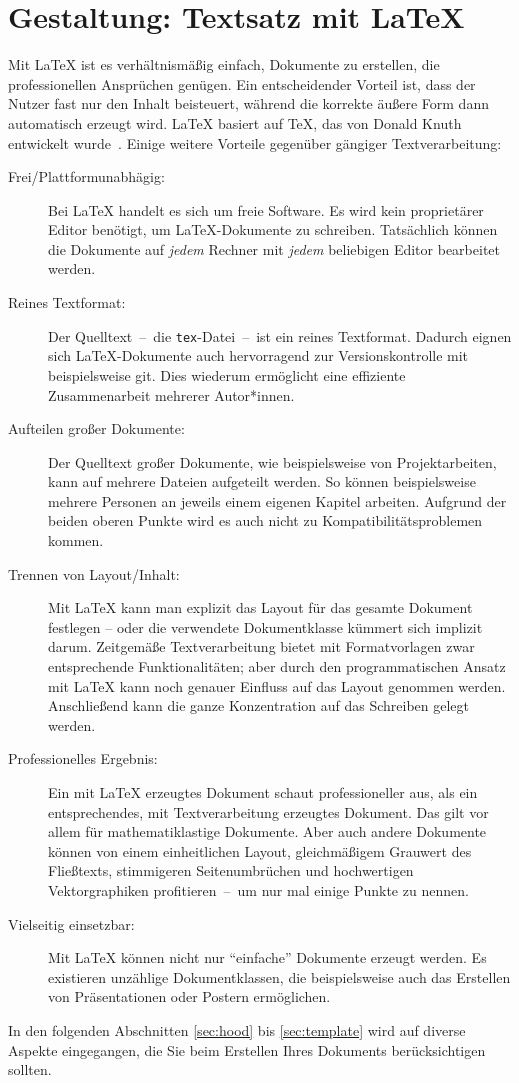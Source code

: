 \chapter{Gestaltung: Textsatz mit \LaTeX}
\label{chap:Textsatz}
%
Mit \LaTeX{} ist es verhältnismäßig einfach, Dokumente zu erstellen, die professionellen Ansprüchen genügen. Ein entscheidender Vorteil ist, dass der Nutzer fast nur den Inhalt beisteuert, während die korrekte äußere Form dann automatisch erzeugt wird. \LaTeX{} basiert auf \TeX{}, das von Donald Knuth entwickelt wurde~\cite{knuth:tex}. Einige weitere Vorteile gegenüber gängiger
Textverarbeitung:
\begin{description}
	\item[Frei/Plattformunabhägig:] Bei \LaTeX{} handelt es sich um freie 
	Software. Es wird kein proprietärer Editor benötigt, um \LaTeX{}-Dokumente
	zu schreiben. Tatsächlich können die Dokumente auf \emph{jedem} Rechner
	mit \emph{jedem} beliebigen Editor bearbeitet werden.
	\item[Reines Textformat:] Der Quelltext~--~die \texttt{tex}-Datei~--~ist
	ein reines Textformat. Dadurch eignen sich \LaTeX{}-Dokumente auch 
	hervorragend zur Versionskontrolle mit beispielsweise git. Dies wiederum
	ermöglicht eine effiziente Zusammenarbeit mehrerer Autor*innen.
	\item[Aufteilen großer Dokumente:] Der Quelltext großer Dokumente, wie 
	beispielsweise von Projektarbeiten, kann auf mehrere Dateien
	aufgeteilt werden. So können beispielsweise mehrere Personen an jeweils
	einem eigenen Kapitel arbeiten. Aufgrund der beiden oberen Punkte wird es 
	auch nicht zu Kompatibilitätsproblemen kommen.
	\item[Trennen von Layout/Inhalt:] Mit \LaTeX{} kann man explizit das
	Layout für das gesamte Dokument festlegen -- oder die verwendete 
	Dokumentklasse kümmert sich implizit darum. Zeitgemäße Textverarbeitung
	bietet mit Formatvorlagen zwar entsprechende Funktionalitäten; aber
	durch den programmatischen Ansatz mit \LaTeX{} kann noch genauer
	Einfluss auf das Layout genommen werden. Anschließend kann die ganze
	Konzentration auf das Schreiben gelegt werden.
	\item[Professionelles Ergebnis:] Ein mit \LaTeX{} erzeugtes Dokument
	schaut professioneller aus, als ein entsprechendes, mit Textverarbeitung
	erzeugtes Dokument. Das gilt vor allem für mathematiklastige Dokumente.
	Aber auch andere Dokumente können von einem einheitlichen 
	Layout, gleichmäßigem Grauwert des Fließtexts, stimmigeren Seitenumbrüchen 
	und hochwertigen Vektorgraphiken profitieren~--~um nur mal einige Punkte zu 
	nennen.
	\item[Vielseitig einsetzbar:] Mit \LaTeX{} können nicht nur 
	\enquote{einfache} Dokumente erzeugt werden. Es existieren unzählige
	Dokumentklassen, die beispielsweise auch das Erstellen von Präsentationen
	oder Postern ermöglichen.
\end{description}
\par
In den folgenden Abschnitten \ref{sec:hood} bis \ref{sec:template} wird auf diverse Aspekte eingegangen, die Sie beim Erstellen Ihres Dokuments berücksichtigen sollten.
%
%
